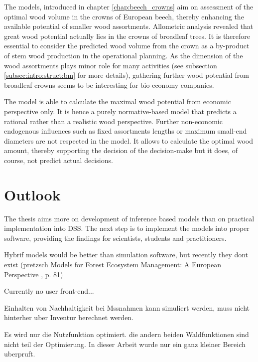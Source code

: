 The models, introduced in chapter \ref{chap:beech_crowns} aim on assessment of the optimal wood volume in the crowns of European beech, thereby enhancing the available potential of smaller wood assortments. Allometric analysis revealed that great wood potential actually lies in the crowns of broadleaf trees. It is therefore essential to consider the predicted wood volume from the crown as a by-product of stem wood production in the operational planning. As the dimension of the wood assortments plays minor role for many activities (see subsection \ref{subsec:intro:struct:bm} for more details), gathering further wood potential from broadleaf crowns seems to be interesting for bio-economy companies.

The model is able to calculate the maximal wood potential from economic perspective only. It is hence a purely normative-based model that predicts a rational rather than a realistic wood perspective. Further non-economic endogenous influences such as fixed assortments lengths or maximum small-end diameters are not respected in the model. It allows to calculate the optimal wood amount, thereby supporting the decision of the decision-make but it does, of course, not predict actual decisions.

\section{Outlook}
\label{sec:discussion:outlook}
The thesis aims more on development of inference based models than on practical implementation into DSS. The next step is to implement the models into proper software, providing the findings for scientists, students and practitioners.

Hybrif models would be better than simulation software, but recently they dont exist (pretzsch Models for Forest Ecosystem Management: A European Perspective
, p. 81)

Currently no user front-end...

Einhalten von Nachhaltigkeit bei Mssnahmen kann simuliert werden, muss nicht hinterher uber Inventur berechnet werden.

Es wird nur die Nutzfunktion optimiert. die andern beiden Waldfunktionen sind nicht teil der Optimierung.
In dieser Arbeit wurde nur ein ganz kleiner Bereich uberpruft.
